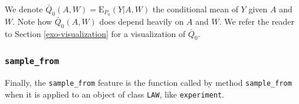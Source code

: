 \documentclass[
  11pt,
  openright,twoside]{book}
\newcommand{\Exp}{\textrm{E}}
\newcommand{\Qbar}{\bar{Q}}
\theoremstyle{definition}
\theoremstyle{definition}
\theoremstyle{definition}
\theoremstyle{definition}
\theoremstyle{remark}
\begin{document}
We denote \(\Qbar_0(A,W) = \Exp_{P_{0}}(Y|A,W)\) the conditional mean of \(Y\)
given \(A\) and \(W\). Note how \(\Qbar_0(A,W)\) does depend heavily on \(A\) and
\(W\). We refer the reader to Section \ref{exo-visualization} for a
visualization of \(\Qbar_{0}\).

\hypertarget{sample_from}{%
\subsubsection*{\texorpdfstring{\texttt{sample\_from}}{sample\_from}}\label{sample_from}}

Finally, the \texttt{sample\_from} feature is the function called by method
\texttt{sample\_from} when it is applied to an object of class \texttt{LAW}, like
\texttt{experiment}.
\end{document}
